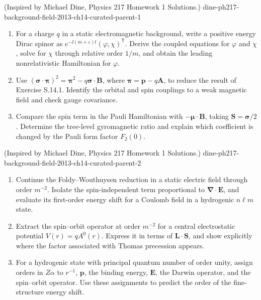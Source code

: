 
\begin{enumerate}
  {(Inspired by Michael Dine, Physics 217 Homework 1 Solutions.)}
  {dine-ph217-background-field-2013-ch14-curated-parent-1}
\begin{enumerate}
\item
For a charge \(q\) in a static electromagnetic background, write a positive
energy Dirac spinor as \(e^{-\ii(m+\varepsilon)t}(\varphi,\chi)^{\mathsf T}\).
Derive the coupled equations for \(\varphi\) and \(\chi\), solve for \(\chi\)
through relative order \(1/m\), and obtain the leading nonrelativistic
Hamiltonian for \(\varphi\).
\item
Use
\((\boldsymbol\sigma\cdot\boldsymbol\pi)^2
=\boldsymbol\pi^2-q\boldsymbol\sigma\cdot\mathbf B\), where
\(\boldsymbol\pi=\mathbf p-q\mathbf A\), to reduce the result of Exercise
S.14.1.  Identify the orbital and spin couplings to a weak magnetic field
and check gauge covariance.
\item
Compare the spin term in the Pauli Hamiltonian with
\(-\boldsymbol\mu\cdot\mathbf B\), taking
\(\mathbf S=\boldsymbol\sigma/2\).  Determine the tree-level gyromagnetic
ratio and explain which coefficient is changed by the Pauli form factor
\(F_2(0)\).
\end{enumerate}

  {(Inspired by Michael Dine, Physics 217 Homework 1 Solutions.)}
  {dine-ph217-background-field-2013-ch14-curated-parent-2}
\begin{enumerate}
\item
Continue the Foldy--Wouthuysen reduction in a static electric field through
order \(m^{-2}\).  Isolate the spin-independent term proportional to
\(\boldsymbol\nabla\cdot\mathbf E\), and evaluate its first-order energy
shift for a Coulomb field in a hydrogenic \(n\ell m\) state.
\item
Extract the spin--orbit operator at order \(m^{-2}\) for a central
electrostatic potential \(V(r)=qA^0(r)\).  Express it in terms of
\(\mathbf L\cdot\mathbf S\), and show explicitly where the factor associated
with Thomas precession appears.
\item
For a hydrogenic state with principal quantum number of order unity, assign
orders in \(Z\alpha\) to \(r^{-1}\), \(\mathbf p\), the binding energy,
\(\mathbf E\), the Darwin operator, and the spin--orbit operator.  Use these
assignments to predict the order of the fine-structure energy shift.
\end{enumerate}


\end{enumerate}
